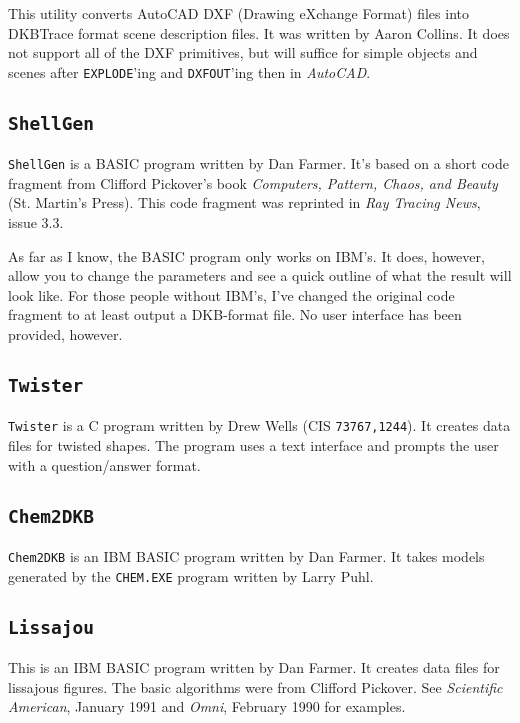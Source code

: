 This utility converts AutoCAD DXF (Drawing eXchange Format) files into
DKBTrace format scene description files.  It was written by Aaron
Collins.  It does not support all of the DXF primitives, but will
suffice for simple objects and scenes after {\tt EXPLODE}'ing and
{\tt DXFOUT}'ing then in {\em AutoCAD}.

\subsection{{\tt ShellGen}}

{\tt ShellGen} is a BASIC program written by Dan Farmer.  It's based
on a short code fragment from Clifford Pickover's book
{\em Computers, Pattern, Chaos, and Beauty} (St. Martin's Press).
This code fragment was reprinted in {\em Ray Tracing News}, issue 3.3.

As far as I know, the BASIC program only works on IBM's.  It does,
however, allow you to change the parameters and see a quick outline of
what the result will look like.  For those people without IBM's, I've
changed the original code fragment to at least output a DKB-format
file.  No user interface has been provided, however.

\subsection{{\tt Twister}}

{\tt Twister} is a C program written by Drew Wells (CIS {\tt 73767,1244}).
It creates data files for twisted shapes.  The program
uses a text interface and prompts the user with a question/answer
format.

\subsection{{\tt Chem2DKB}}

{\tt Chem2DKB} is an IBM BASIC program written by Dan Farmer.  It takes models
generated by the {\tt CHEM.EXE} program written by Larry Puhl.

\subsection{{\tt Lissajou}}

This is an IBM BASIC program written by Dan Farmer.  It creates data
files for lissajous figures.  The basic algorithms were from Clifford
Pickover.  See {\em Scientific American}, January 1991 and {\em Omni},
February 1990 for examples.

